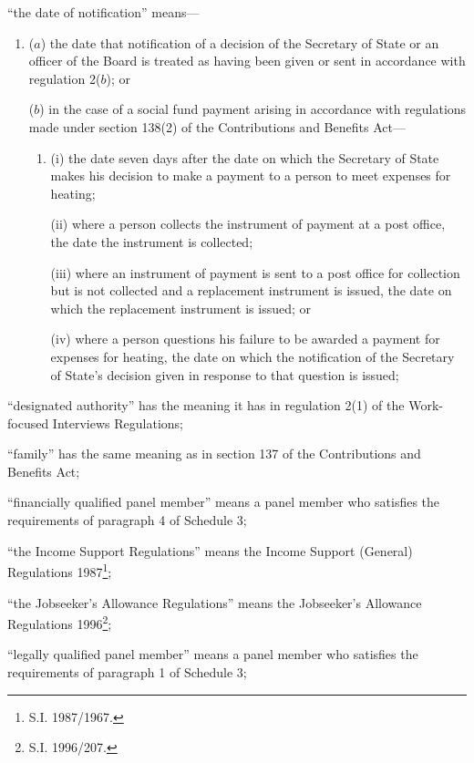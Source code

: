 \documentclass[12pt,a4paper]{article}
\begin{document}
\begin{enumerate}
“the date of notification” means—
\begin{enumerate}\item[]
($a$) the date that notification of a decision of the Secretary of State 
or an officer of the Board  %
is treated as having been given or sent in accordance with regulation 2($b$); or

($b$) in the case of a social fund payment arising in accordance with regulations made under section 138(2) of the Contributions and Benefits Act—
\begin{enumerate}\item[]
(i) the date seven days after the date on which the Secretary of State makes his decision to make a payment to a person to meet expenses for heating;

(ii) where a person collects the instrument of payment at a post office, the date the instrument is collected;

(iii) where an instrument of payment is sent to a post office for collection but is not collected and a replacement instrument is issued, the date on which the replacement instrument is issued; or

(iv) where a person questions his failure to be awarded a payment for expenses for heating, the date on which the notification of the Secretary of State’s decision given in response to that question is issued;
\end{enumerate}
\end{enumerate}

“designated authority” has the meaning it has in regulation 2(1) of the Work-focused Interviews Regulations;

“family” has the same meaning as in section 137 of the Contributions and Benefits Act;

“financially qualified panel member” means a panel member who satisfies the requirements of paragraph 4 of Schedule 3;

“the Income Support Regulations” means the Income Support (General) Regulations 1987\footnote{\frenchspacing S.I. 1987/1967.};

“the Jobseeker’s Allowance Regulations” means the Jobseeker’s Allowance Regulations 1996\footnote{\frenchspacing S.I. 1996/207.};

“legally qualified panel member” means a panel member who satisfies the requirements of paragraph 1 of Schedule 3;


\end{enumerate}
\end{document}
